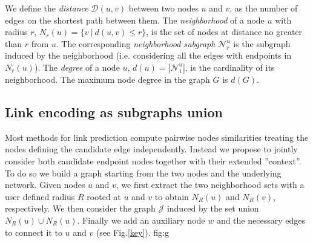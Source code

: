 \documentclass[runningheads,a4paper]{llncs}
\begin{document}
We define the \textit{distance} $\mathcal{D}(u,v)$ between two nodes $u$ and $v$, as the number of edges on the shortest path between them. The \textit{neighborhood} of a node $u$ with radius $r$, $N_r(u) = \lbrace v\ |\ d(u,v) \leq r \rbrace$, is the set of nodes at distance no greater than $r$ from $u$. The corresponding \textit{neighborhood subgraph} $\mathcal{N}_{r}^{u}$ is the  subgraph induced by the neighborhood (i.e. considering all the edges with endpoints in $N_r(u)$). The \textit{degree} of a node $u$, $d(u) = |\mathcal{N}_{1}^{u}|$, is the cardinality of its neighborhood. The maximum node degree in the graph $G$ is $d(G)$.



\subsection{Link encoding as subgraphs union}
\label{sec:link}
Most methods for link prediction compute pairwise nodes similarities treating  the nodes defining the candidate edge independently. Instead we propose to jointly consider both candidate endpoint nodes together with their extended ''context''. To do so we build a graph starting from the two nodes and the underlying network. Given nodes $u$ and $v$, we first extract the two neighborhood sets with a user defined radius $R$ rooted at $u$ and $v$ to obtain $N_R(u)$ and $N_R(v)$, respectively. We then consider the graph $\mathcal{J}$ induced by the set union $N_R(u) \cup N_R(u)$. Finally we add an auxiliary node $w$ and the necessary edges to connect it to $u$ and $v$ (see Fig.\ref{key}).
\figurename{fig:g}
\end{document}
